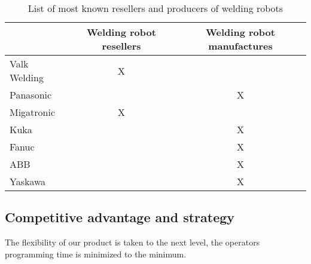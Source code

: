 \begin{table}[h]
\centering
\begin{tabular}{|l|c|c|}
\hline
& Welding robot resellers & Welding robot manufactures \\ 
\hline
Valk Welding & X &  \\ 
\hline
Panasonic &  & X \\ 
\hline
Migatronic & X &  \\ 
\hline
Kuka & & X \\ 
\hline
Fanuc &  & X \\ 
\hline
ABB & & X \\ 
\hline
Yaskawa &  & X \\ 
\hline
\end{tabular} 
\label{Tablecompetitors}
\caption{List of most known resellers and producers of welding robots}
\end{table}


\subsection{Competitive advantage and strategy}
The flexibility of our product is taken to the next level, the operators programming time is minimized to the minimum. %
